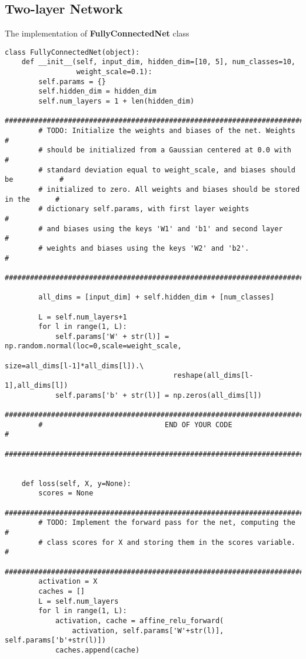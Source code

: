 \documentclass[a4paper,12pt]{article}
\begin{document}
\clearpage
\subsection{Two-layer Network}
The implementation of \textbf{FullyConnectedNet} class
\begin{lstlisting}
class FullyConnectedNet(object):
    def __init__(self, input_dim, hidden_dim=[10, 5], num_classes=10,
                 weight_scale=0.1):
        self.params = {}
        self.hidden_dim = hidden_dim
        self.num_layers = 1 + len(hidden_dim)
        ############################################################################
        # TODO: Initialize the weights and biases of the net. Weights              #
        # should be initialized from a Gaussian centered at 0.0 with               #
        # standard deviation equal to weight_scale, and biases should be           #
        # initialized to zero. All weights and biases should be stored in the      #
        # dictionary self.params, with first layer weights                         #
        # and biases using the keys 'W1' and 'b1' and second layer                 #
        # weights and biases using the keys 'W2' and 'b2'.                         #
        ############################################################################

        all_dims = [input_dim] + self.hidden_dim + [num_classes]

        L = self.num_layers+1
        for l in range(1, L):
            self.params['W' + str(l)] = np.random.normal(loc=0,scale=weight_scale,
                                                        size=all_dims[l-1]*all_dims[l]).\
                                        reshape(all_dims[l-1],all_dims[l])                           
            self.params['b' + str(l)] = np.zeros(all_dims[l])
        ############################################################################
        #                             END OF YOUR CODE                             #
        ############################################################################


    def loss(self, X, y=None):
        scores = None
        ############################################################################
        # TODO: Implement the forward pass for the net, computing the              #
        # class scores for X and storing them in the scores variable.              #
        ############################################################################
        activation = X
        caches = []
        L = self.num_layers
        for l in range(1, L):
            activation, cache = affine_relu_forward(
                activation, self.params['W'+str(l)], self.params['b'+str(l)])
            caches.append(cache)


\end{lstlisting}
\end{document}
